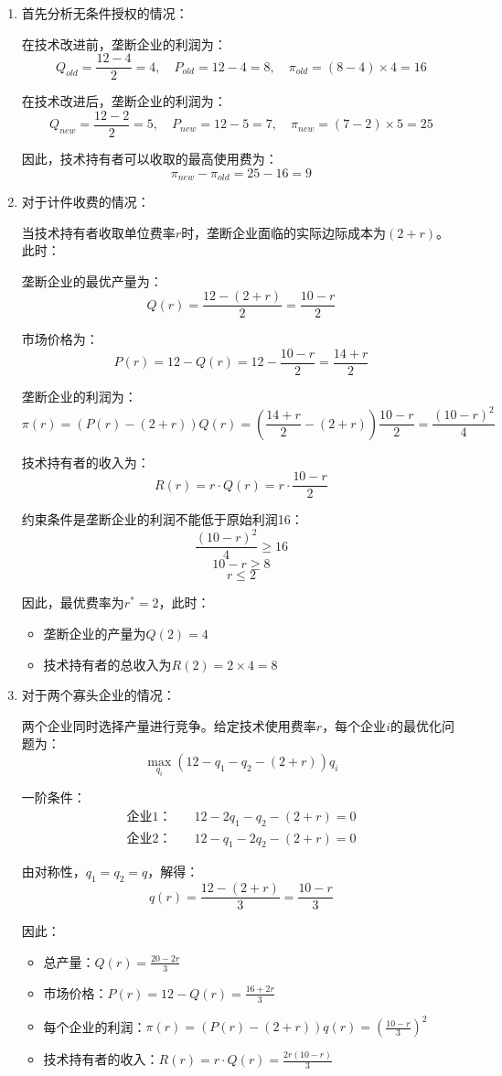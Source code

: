 \documentclass[12pt]{article}
\begin{document}
\begin{enumerate}
\item 首先分析无条件授权的情况：

在技术改进前，垄断企业的利润为：
\[Q_{old} = \frac{12-4}{2} = 4, \quad P_{old} = 12-4 = 8, \quad \pi_{old} = (8-4)\times 4 = 16\]

在技术改进后，垄断企业的利润为：
\[Q_{new} = \frac{12-2}{2} = 5, \quad P_{new} = 12-5 = 7, \quad \pi_{new} = (7-2)\times 5 = 25\]

因此，技术持有者可以收取的最高使用费为：
\[\pi_{new} - \pi_{old} = 25 - 16 = 9\]

\item 对于计件收费的情况：

当技术持有者收取单位费率$r$时，垄断企业面临的实际边际成本为$(2+r)$。此时：

垄断企业的最优产量为：
\[Q(r) = \frac{12-(2+r)}{2} = \frac{10-r}{2}\]

市场价格为：
\[P(r) = 12-Q(r) = 12-\frac{10-r}{2} = \frac{14+r}{2}\]

垄断企业的利润为：
\[\pi(r) = (P(r)-(2+r))Q(r) = (\frac{14+r}{2}-(2+r))\frac{10-r}{2} = \frac{(10-r)^2}{4}\]

技术持有者的收入为：
\[R(r) = r\cdot Q(r) = r\cdot\frac{10-r}{2}\]

约束条件是垄断企业的利润不能低于原始利润16：
\[\frac{(10-r)^2}{4} \geq 16\]
\[10-r \geq 8\]
\[r \leq 2\]

因此，最优费率为$r^* = 2$，此时：
\begin{itemize}
\item 垄断企业的产量为$Q(2) = 4$
\item 技术持有者的总收入为$R(2) = 2\times4 = 8$
\end{itemize}

\item 对于两个寡头企业的情况：

两个企业同时选择产量进行竞争。给定技术使用费率$r$，每个企业$i$的最优化问题为：
\[\max_{q_i} (12-q_1-q_2-(2+r))q_i\]

一阶条件：
\begin{align*}
\text{企业1：} \quad & 12-2q_1-q_2-(2+r)=0\\
\text{企业2：} \quad & 12-q_1-2q_2-(2+r)=0
\end{align*}

由对称性，$q_1=q_2=q$，解得：
\[q(r)=\frac{12-(2+r)}{3}=\frac{10-r}{3}\]

因此：
\begin{itemize}
\item 总产量：$Q(r)=\frac{20-2r}{3}$
\item 市场价格：$P(r)=12-Q(r)=\frac{16+2r}{3}$
\item 每个企业的利润：$\pi(r)=(P(r)-(2+r))q(r)=(\frac{10-r}{3})^2$
\item 技术持有者的收入：$R(r)=r\cdot Q(r)=\frac{2r(10-r)}{3}$
\end{itemize}


\end{enumerate}
\end{document}
